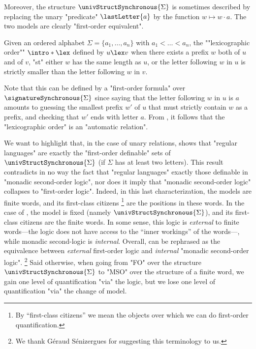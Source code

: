 Moreover, the structure $\univStructSynchronous{\Sigma}$ is sometimes described by replacing
the unary "predicate" $\lastLetter{a}$ by the function $w \mapsto w\cdot a$.
The two models are clearly "first-order equivalent".

\begin{example}
	\AP\label{ex:lexicographic-is-automatic}
	Given an ordered alphabet $\Sigma = \{a_1,\hdots,a_n\}$ with $a_1 < \hdots < a_n$,
	the \AP""lexicographic order"" $\intro*\lex$ defined by $u \lex v$ when there exists 
	a prefix $w$ both of $u$ and of $v$, "st" either $w$ has the same length as $u$,
	or the letter following $w$ in $u$ is strictly smaller than the letter following $w$ in $v$.
	
	Note that this can be defined by a "first-order formula" over $\signatureSynchronous{\Sigma}$
	since saying that the letter following $w$ in $u$ is $a$ amounts to
	guessing the smallest prefix $w'$ of $u$ that must strictly contain $w$ as a prefix,
	and checking that $w'$ ends with letter $a$.
	From , it follows that the "lexicographic order"
	is an "automatic relation".
\end{example}

We want to highlight that, in the case of unary relations,
 shows that "regular languages" are exactly
the "first-order definable" sets of $\univStructSynchronous{\Sigma}$
(if $\Sigma$ has at least two letters).
This result contradicts in no way the fact that "regular languages" exactly those definable
in "monadic second-order logic", nor does it imply that "monadic second-order logic"
collapses to "first-order logic". Indeed, in this last characterization,
the models are finite words, and its first-class citizens%
\footnote{By ``first-class citizens'' we mean the objects over which
we can do first-order quantification.} are the positions in these words.
In the case of , the model is fixed (namely $\univStructSynchronous{\Sigma}$), and its first-class citizens are the finite words.
In some sense, this logic is \emph{external} to finite words---the logic does not have access to the
``inner workings'' of the words---, while monadic second-logic is \emph{internal}.
Overall,  can be rephrased as the equivalence between
\emph{external} first-order logic and \emph{internal} "monadic second-order logic".%
\footnote{We thank Géraud Sénizergues for suggesting this terminology to us.}
Said otherwise, when going from "FO" over the structure $\univStructSynchronous{\Sigma}$ to "MSO" 
over the structure of a finite word, we gain one level of quantification "via" the logic,
but we lose one level of quantification "via" the change of model.
 


